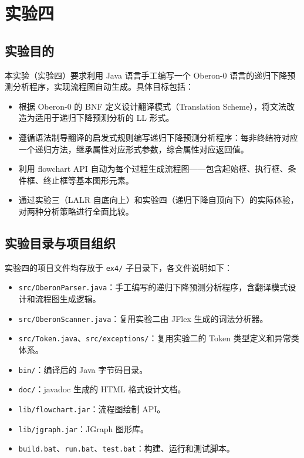 \chapter{实验四}

\section*{实验目的}

本实验（实验四）要求利用 Java 语言手工编写一个 Oberon-0 语言的递归下降预测分析程序，实现流程图自动生成。具体目标包括：

\begin{itemize}
    \item 根据 Oberon-0 的 BNF 定义设计翻译模式（Translation Scheme），将文法改造为适用于递归下降预测分析的 LL 形式。
    \item 遵循语法制导翻译的启发式规则编写递归下降预测分析程序：每非终结符对应一个递归方法，继承属性对应形式参数，综合属性对应返回值。
    \item 利用 flowchart API 自动为每个过程生成流程图——包含起始框、执行框、条件框、终止框等基本图形元素。
    \item 通过实验三（LALR 自底向上）和实验四（递归下降自顶向下）的实际体验，对两种分析策略进行全面比较。
\end{itemize}

\section*{实验目录与项目组织}

实验四的项目文件均存放于 \texttt{ex4/} 子目录下，各文件说明如下：

\begin{itemize}
    \item \texttt{src/OberonParser.java}：手工编写的递归下降预测分析程序，含翻译模式设计和流程图生成逻辑。
    \item \texttt{src/OberonScanner.java}：复用实验二由 JFlex 生成的词法分析器。
    \item \texttt{src/Token.java}、\texttt{src/exceptions/}：复用实验二的 Token 类型定义和异常类体系。
    \item \texttt{bin/}：编译后的 Java 字节码目录。
    \item \texttt{doc/}：javadoc 生成的 HTML 格式设计文档。
    \item \texttt{lib/flowchart.jar}：流程图绘制 API。
    \item \texttt{lib/jgraph.jar}：JGraph 图形库。
    \item \texttt{build.bat}、\texttt{run.bat}、\texttt{test.bat}：构建、运行和测试脚本。
\end{itemize}

